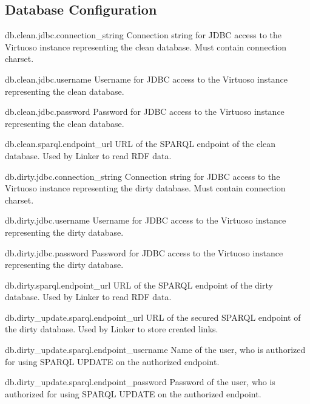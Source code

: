 \subsection*{Database Configuration}
\begin{configlist}
	\item[db.clean.jdbc.connection\_string]
	  Connection string for JDBC access to the Virtuoso instance representing the clean database. Must contain connection charset.
	\item[db.clean.jdbc.username]
	  Username for JDBC access to the Virtuoso instance representing the clean database.
	\item[db.clean.jdbc.password]
	  Password for JDBC access to the Virtuoso instance representing the clean database.
	\item[db.clean.sparql.endpoint\_url]
	  URL of the SPARQL endpoint of the clean database. Used by Linker to read RDF data.

	\item[db.dirty.jdbc.connection\_string]
		Connection string for JDBC access to the Virtuoso instance representing the dirty database. Must contain connection charset.
	\item[db.dirty.jdbc.username]
		Username for JDBC access to the Virtuoso instance representing the dirty database.
	\item[db.dirty.jdbc.password]
		Password for JDBC access to the Virtuoso instance representing the dirty database.
	\item[db.dirty.sparql.endpoint\_url]
		URL of the SPARQL endpoint of the dirty database. Used by Linker to read RDF data.
	\item[db.dirty\_update.sparql.endpoint\_url]
		URL of the secured SPARQL endpoint of the dirty database. Used by Linker to store created links.
	\item[db.dirty\_update.sparql.endpoint\_username]
		Name of the user, who is authorized for using SPARQL UPDATE on the authorized endpoint.
	\item[db.dirty\_update.sparql.endpoint\_password]
		Password of the user, who is authorized for using SPARQL UPDATE on the authorized endpoint.
\end{configlist}

